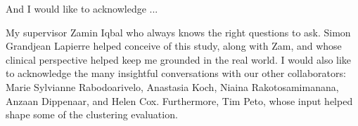 
\begin{acknowledgements}      


And I would like to acknowledge ...

My supervisor Zamin Iqbal who always knows the right questions to ask. Simon Grandjean Lapierre helped conceive of this study, along with Zam, and whose clinical perspective helped keep me grounded in the real world. I would also like to acknowledge the many insightful conversations with our other collaborators: Marie Sylvianne Rabodoarivelo, Anastasia Koch, Niaina Rakotosamimanana, Anzaan Dippenaar, and Helen Cox. Furthermore, Tim Peto, whose input helped shape some of the clustering evaluation.

\end{acknowledgements}
